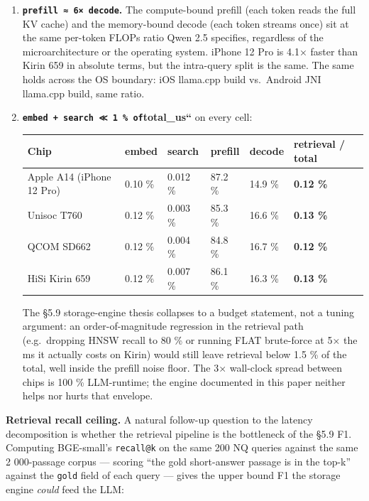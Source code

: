 \begin{enumerate}
\def\labelenumi{\arabic{enumi}.}
\item
  \textbf{\texttt{prefill\ ≈\ 6×\ decode}.} The compute-bound prefill (each
  token reads the full KV cache) and the memory-bound decode (each token streams
  once) sit at the same per-token FLOPs ratio Qwen 2.5 specifies, regardless of
  the microarchitecture or the operating system. iPhone 12 Pro is 4.1× faster
  than Kirin 659 in absolute terms, but the intra-query split is the same. The
  same holds across the OS boundary: iOS llama.cpp build vs.~Android JNI
  llama.cpp build, same ratio.
\item
  \textbf{\texttt{embed\ +\ search\ ≪\ 1\ \%\ of}total\_us``} on every cell:

  {\def\LTcaptype{none} %
  \begin{longtable}[]{@{}llllll@{}}
  \toprule\noalign{}
  Chip & embed & search & prefill & decode & retrieval / total \\
  \midrule\noalign{}
  \endhead
  \bottomrule\noalign{}
  \endlastfoot
  Apple A14 (iPhone 12 Pro) & 0.10 \% & 0.012 \% & 87.2 \% & 14.9 \% &
  \textbf{0.12 \%} \\
  Unisoc T760 & 0.12 \% & 0.003 \% & 85.3 \% & 16.6 \% & \textbf{0.13 \%} \\
  QCOM SD662 & 0.12 \% & 0.004 \% & 84.8 \% & 16.7 \% & \textbf{0.12 \%} \\
  HiSi Kirin 659 & 0.12 \% & 0.007 \% & 86.1 \% & 16.3 \% & \textbf{0.13 \%} \\
  \end{longtable}
  }

  The §5.9 storage-engine thesis collapses to a budget statement, not a tuning
  argument: an order-of-magnitude regression in the retrieval path
  (e.g.~dropping HNSW recall to 80 \% or running FLAT brute-force at 5× the ms
  it actually costs on Kirin) would still leave retrieval below 1.5 \% of the
  total, well inside the prefill noise floor. The 3× wall-clock spread between
  chips is 100 \% LLM-runtime; the engine documented in this paper neither helps
  nor hurts that envelope.
\end{enumerate}

\textbf{Retrieval recall ceiling.} A natural follow-up question to the latency
decomposition is whether the retrieval pipeline is the bottleneck of the §5.9
F1. Computing BGE-small's \texttt{recall@k} on the same 200 NQ queries against
the same 2 000-passage corpus --- scoring ``the gold short-answer passage is in
the top-k'' against the \texttt{gold} field of each query --- gives the upper
bound F1 the storage engine \emph{could} feed the LLM:


